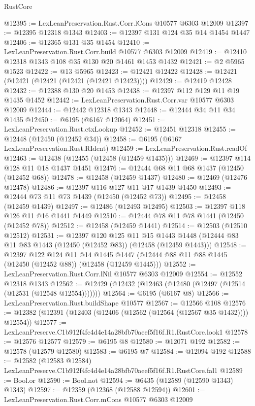 \begin{lexlean}{RustCore}
\begin{coremodule}
@12395 := LexLeanPreservation.Rust.Corr.lCons @10577 @6303 @12009
@12397 := @12395 @12318 @1343
@12403 := @12397 @131 @124 @35 @14 @1454 @1447
@12406 := @12365 @131 @35 @1454
@12410 := LexLeanPreservation.Rust.Corr.build @10577 @6303 @12009
@12419 := @12410 @12318 @1343 @108 @35 @130 @20 @1461 @1453 @1432
@12421 := @2 @5965 @1523
@12422 := @13 @5965
@12423 := @12421 @12422
@12428 := @12421 (@12421 (@12421 (@12421 (@12421 @12423))))
@12429 := @12419 @12428
@12432 := @12388 @130 @20 @1453
@12438 := @12397 @112 @129 @11 @19 @1435 @1452
@12442 := LexLeanPreservation.Rust.Corr.var @10577 @6303 @12009
@12444 := @12442 @12318 @1343
@12448 := @12444 @34 @11 @34 @1435
@12450 := @6195 (@6167 @12064)
@12451 := LexLeanPreservation.Rust.ctxLookup
@12452 := @12451 @12318
@12455 := @12448 (@12450 (@12452 @34))
@12458 := @6195 (@6167 LexLeanPreservation.Rust.RIdent)
@12459 := LexLeanPreservation.Rust.readOf
@12463 := @12438 (@12455 (@12458 (@12459 @1435)))
@12469 := @12397 @114 @128 @11 @18 @1437 @1451
@12476 := @12444 @68 @11 @68 @1437 (@12450 (@12452 @68))
@12478 := @12458 (@12459 @1437)
@12480 := @12469 (@12476 @12478)
@12486 := @12397 @116 @127 @11 @17 @1439 @1450
@12493 := @12444 @73 @11 @73 @1439 (@12450 (@12452 @73))
@12495 := @12458 (@12459 @1439)
@12497 := @12486 (@12493 @12495)
@12503 := @12397 @118 @126 @11 @16 @1441 @1449
@12510 := @12444 @78 @11 @78 @1441 (@12450 (@12452 @78))
@12512 := @12458 (@12459 @1441)
@12514 := @12503 (@12510 @12512)
@12531 := @12397
    @120
    @125
    @11
    @15
    @1443
    @1448
    (@12444 @83 @11 @83 @1443 (@12450 (@12452 @83)) (@12458 (@12459 @1443)))
@12548 := @12397
    @122
    @124
    @11
    @14
    @1445
    @1447
    (@12444 @88 @11 @88 @1445 (@12450 (@12452 @88)) (@12458 (@12459 @1445)))
@12552 := LexLeanPreservation.Rust.Corr.lNil @10577 @6303 @12009
@12554 := @12552 @12318 @1343
@12562 := @12429 (@12432 (@12463 (@12480 (@12497 (@12514 (@12531 (@12548 @12554)))))))
@12564 := @6195 (@6167 @8)
@12566 := LexLeanPreservation.Rust.buildShape @10577
@12567 := @12566 @108
@12576 := @12382 (@12391 (@12403 (@12406 (@12562 (@12564 (@12567 @35 @1432)))) @12554))
@12577 := LexLeanPreserve.C1b912f4fc4d4e14a28bfb70aeef5f16f.R1.RustCore.look1
@12578 := @12576 @12577
@12579 := @6195 @8
@12580 := @12071 @192
@12582 := @12578 (@12579 @12580)
@12583 := @6195 @7
@12584 := @12094 @192
@12588 := @12582 (@12583 @12584) LexLeanPreserve.C1b912f4fc4d4e14a28bfb70aeef5f16f.R1.RustCore.fal1
@12589 := Bool.or
@12590 := Bool.not
@12594 := @6435 (@12589 (@12590 @1343) @1343)
@12597 := @12359 (@12368 (@12588 @12594))
@12601 := LexLeanPreservation.Rust.Corr.mCons @10577 @6303 @12009

\end{coremodule}
\end{lexlean}
